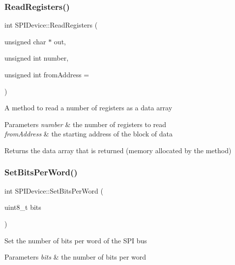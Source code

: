 \subsubsection{\texorpdfstring{Read\+Registers()}{ReadRegisters()}}
{\footnotesize\ttfamily int S\+P\+I\+Device\+::\+Read\+Registers (\begin{DoxyParamCaption}\item[{unsigned char $\ast$}]{out,  }\item[{unsigned int}]{number,  }\item[{unsigned int}]{from\+Address = {} }\end{DoxyParamCaption})\hspace{0.3cm}{\ttfamily [virtual]}}

A method to read a number of registers as a data array 
\begin{DoxyParams}{Parameters}
{\em number} & the number of registers to read \\
\hline
{\em from\+Address} & the starting address of the block of data \\
\hline
\end{DoxyParams}
\begin{DoxyReturn}{Returns}
the data array that is returned (memory allocated by the method) 
\end{DoxyReturn}
\mbox{\label{classcubesat_1_1SPIDevice_a9b3cfba87ed783827d4d6327fc4144fc}} 
\subsubsection{\texorpdfstring{Set\+Bits\+Per\+Word()}{SetBitsPerWord()}}
{\footnotesize\ttfamily int S\+P\+I\+Device\+::\+Set\+Bits\+Per\+Word (\begin{DoxyParamCaption}\item[{uint8\+\_\+t}]{bits }\end{DoxyParamCaption})\hspace{0.3cm}{\ttfamily [virtual]}}

Set the number of bits per word of the S\+PI bus 
\begin{DoxyParams}{Parameters}
{\em bits} & the number of bits per word \\
\hline
\end{DoxyParams}
\mbox{\label{classcubesat_1_1SPIDevice_a321ab218e4890997ea6bafbd8b8552b5}} 

